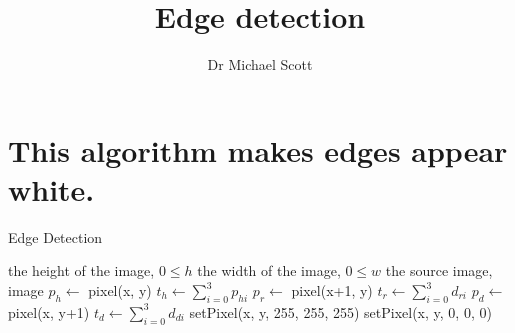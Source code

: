 \documentclass{../../../fal_assignment}
\title{Edge detection}
\author{Dr Michael Scott}
\begin{document}
\maketitle

	\section{This algorithm makes edges appear white.}
\begin{algorithm}[ht]
	\caption{Edge Detection}
	\label{alg:algorithm}
	
	\begin{algorithmic}[1]
		\Require
		\Statex the height of the image, $0 \leq h$
		\Statex the width of the image, $0 \leq w$
		\Statex the source image, image
		\State  $p_h \leftarrow$ pixel(x, y)
		\State $t_h \leftarrow \sum_{i=0}^{3}p_{hi} $
		\State  $p_r \leftarrow$ pixel(x+1, y)
		\State $t_r \leftarrow \sum_{i=0}^{3}d_{ri} $
		\State $p_d \leftarrow$ pixel(x, y+1)
		\State $t_d \leftarrow \sum_{i=0}^{3}d_{di} $
		\State
				\State setPixel(x, y,  255, 255, 255)
		\Else
				\State setPixel(x, y,  0, 0, 0)
		\EndIf
		\EndFor
		\EndFor
		\EndProcedure
	\end{algorithmic}
	
\end{algorithm}
\end{document}
